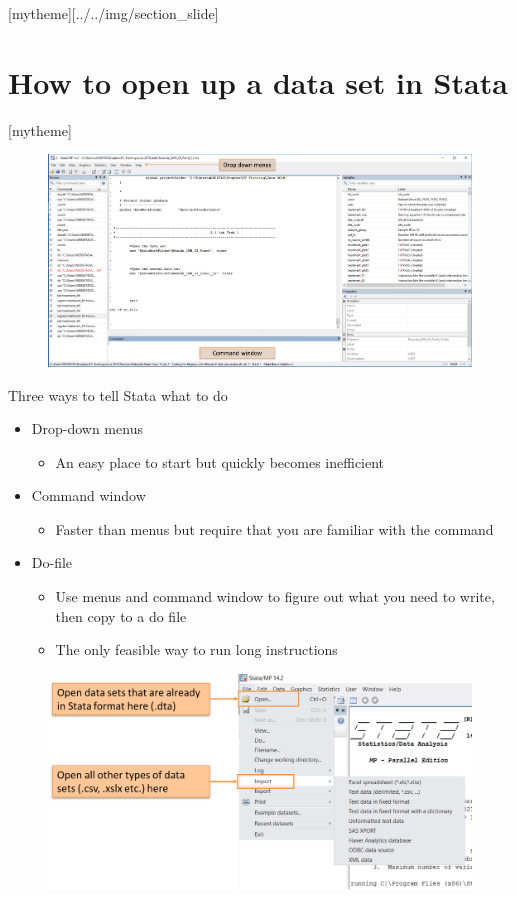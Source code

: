 \documentclass[aspectratio=169]{beamer}
\newcommand{\sectionpic}[2]{
	\setbeamertemplate{section page}[mytheme][#2]
	\section{#1}
	\setbeamertemplate{section page}[mytheme]
}
\begin{document}
\sectionpic{How to open up a data set in Stata}{../../img/section_slide}

\begin{frame}{}
	\begin{figure}
		\centering
		\includegraphics[width=\linewidth]{img/open_dataset}
	\end{figure}
\end{frame}

\begin{frame}{Three ways to tell Stata what to do}
	\begin{itemize}
		\item Drop-down menus
		\begin{itemize}
			\item An easy place to start but quickly becomes inefficient
		\end{itemize}
		\item Command window
		\begin{itemize}
			\item Faster than menus but require that you are familiar with the command
		\end{itemize}
		\item Do-file
		\begin{itemize}
			\item Use menus and command window to figure out what you need to write, then copy to a do file
			\item The only feasible way to run long instructions
		\end{itemize}
	\end{itemize}
\end{frame}

\begin{frame}{}
	\begin{figure}
		\centering
		\includegraphics[width=\linewidth]{img/open_dataset_menu}
	\end{figure}
\end{frame}
\end{document}
